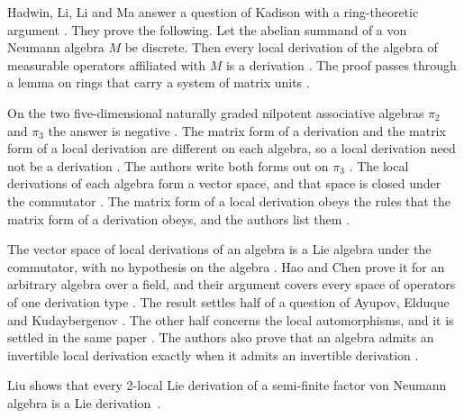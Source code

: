 Hadwin, Li, Li and Ma answer a question of Kadison with a ring-theoretic
argument \cite[p.~1]{HadwinLiLiMa2013}. They prove the following. Let the
abelian summand of a von Neumann algebra $M$ be discrete. Then every local
derivation of the algebra of measurable operators affiliated with $M$ is a
derivation \cite[Theorem~1, pp.~2--3]{HadwinLiLiMa2013}. The proof passes
through a lemma on rings that carry a system of matrix units \cite[Lemma~1,
p.~1]{HadwinLiLiMa2013}.

On the two five-dimensional naturally graded nilpotent associative algebras
$\pi_2$ and $\pi_3$ the answer is negative
\cite[p.~1]{ArzikulovKhakimovQurbonov2026}. The matrix form of a derivation
and the matrix form of a local derivation are different on each algebra, so a
local derivation need not be a derivation
\cite[p.~1]{ArzikulovKhakimovQurbonov2026}. The authors write both forms out
on $\pi_3$ \cite[Theorems~8 and~9, pp.~14--15]{ArzikulovKhakimovQurbonov2026}.
The local derivations of each algebra form a vector space, and that space is
closed under the commutator \cite[Theorems~10 and~11,
p.~15]{ArzikulovKhakimovQurbonov2026}. The matrix form of a local derivation
obeys the rules that the matrix form of a derivation obeys, and the authors
list them \cite[Theorem~5, pp.~10--11]{ArzikulovKhakimovQurbonov2026}.

The vector space of local derivations of an algebra is a Lie algebra under the
commutator, with no hypothesis on the algebra
\cite[Theorem~2.8, p.~4]{HaoChen2026Local}. Hao and Chen prove it for an
arbitrary algebra over a field, and their argument covers every space of
operators of one derivation type \cite[p.~4]{HaoChen2026Local}. The result
settles half of a question of Ayupov, Elduque and Kudaybergenov
\cite[p.~1]{HaoChen2026Local}. The other half concerns the local
automorphisms, and it is settled in the same paper
\cite[p.~1]{HaoChen2026Local}. The authors also prove that an algebra admits
an invertible local derivation exactly when it admits an invertible derivation
\cite[Theorem~2.18, p.~7]{HaoChen2026Local}.


Liu shows that every 2-local Lie derivation of a semi-finite factor von
Neumann algebra is a Lie
derivation~\cite{WlW2LocalLieDerivationsOnSemiFini2016}.


